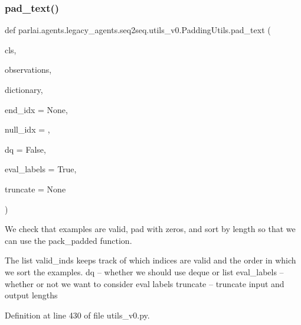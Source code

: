\mbox{\label{classparlai_1_1agents_1_1legacy__agents_1_1seq2seq_1_1utils__v0_1_1PaddingUtils_ae7f9ca3d9fd7dd823895a28af6cae34f}} 
\subsubsection{\texorpdfstring{pad\+\_\+text()}{pad\_text()}}
{\footnotesize\ttfamily def parlai.\+agents.\+legacy\+\_\+agents.\+seq2seq.\+utils\+\_\+v0.\+Padding\+Utils.\+pad\+\_\+text (\begin{DoxyParamCaption}\item[{}]{cls,  }\item[{}]{observations,  }\item[{}]{dictionary,  }\item[{}]{end\+\_\+idx = {\ttfamily None},  }\item[{}]{null\+\_\+idx = {},  }\item[{}]{dq = {\ttfamily False},  }\item[{}]{eval\+\_\+labels = {\ttfamily True},  }\item[{}]{truncate = {\ttfamily None} }\end{DoxyParamCaption})}

\begin{DoxyVerb}We check that examples are valid, pad with zeros, and sort by length so that we
can use the pack_padded function.

The list valid_inds
keeps track of which indices are valid and the order in which we sort
the examples.
dq -- whether we should use deque or list
eval_labels -- whether or not we want to consider eval labels
truncate -- truncate input and output lengths
\end{DoxyVerb}
 

Definition at line 430 of file utils\+\_\+v0.\+py.


